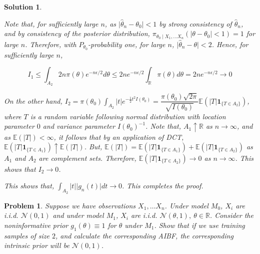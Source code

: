 \documentclass[12pt]{article}
\theoremstyle{problemstyle}
\newtheorem{pbm}{Problem}
\newtheorem*{solution*}{Solution}
\newenvironment{problem}{
\begin{tcolorbox}[colback=green!10!white,colframe=black!75!black, parbox = false]\begin{pbm} }{\end{pbm}\end{tcolorbox} }
\newcommand{\E}{\mathbb{E}}
\newcommand{\normal}{\mathcal{N}}
\newcommand{\R}{\mathbb{R}}
\newcommand{\ind}[1]{\mathbf{1}_{ \{#1\} }}
\begin{document}
\begin{solution*}
\begin{enumerate}
        Note that, for sufficiently large $n$, as $\vert \widehat{\theta}_n - \theta_0\vert < 1$ by strong consistency of $\widehat{\theta}_n$, and by consistency of the posterior distribution, $\pi_{\theta_0 \mid X_1, \dots X_n}(\vert \theta - \theta_0\vert < 1) = 1$ for large $n$. Therefore, with $P_{\theta_0}$-probability one, for large $n$, $\vert \widehat{\theta}_n - \theta \vert < 2$. Hence, for sufficiently large $n$,

        $$
        I_1 \leq \int_{A_2} 2n\pi(\theta) e^{-n\epsilon/2} d\theta \leq 2n e^{-n\epsilon/2} \int_\R \pi(\theta)d\theta = 2n e^{-n\epsilon/2} \rightarrow 0
        $$

        On the other hand, $I_2 = \pi(\theta_0) \int_{A_2} \vert t \vert e^{-\frac{1}{2}t^2 I(\theta_0)} = \dfrac{\pi(\theta_0) \sqrt{2\pi}}{\sqrt{I(\theta_0)}} \E(\vert T\vert \ind{T \in A_2})$, where $T$ is a random variable following normal distribution with location parameter $0$ and variance parameter $I(\theta_0)^{-1}$. Note that, $A_1 \uparrow \R$ as $n \rightarrow \infty$, and as $\E(\vert T \vert) < \infty$, it follows that by an application of DCT, $\E(\vert T \vert \ind{T \in A_1}) \uparrow \E(\vert T \vert)$. But, $\E(\vert T \vert) = \E(\vert T \vert \ind{T \in A_1}) + \E(\vert T \vert \ind{T \in A_2})$ as $A_1$ and $A_2$ are complement sets. Therefore, $\E(\vert T \vert \ind{T \in A_2}) \rightarrow 0$ as $n \rightarrow \infty$. This shows that $I_2 \rightarrow 0$.

        
        This shows that, $\int_{A_2} \vert t \vert \vert g_n(t) \vert dt \rightarrow 0$. This completes the proof.

    \end{enumerate}

\end{solution*}
\pagebreak

\begin{problem}
    Suppose we have observations $X_1, \dots X_n$. Under model $M_0$, $X_i$ are i.i.d. $\normal(0, 1)$ and under model $M_1$, $X_i$ are i.i.d. $\normal(\theta, 1), \ \theta \in \R$. Consider the noninformative prior $g_1(\theta) \equiv 1$ for $\theta$ under $M_1$. Show that if we use training samples of size $2$, and calculate the corresponding AIBF, the corresponding intrinsic prior will be $\normal(0, 1)$.
\end{problem}
\end{document}
